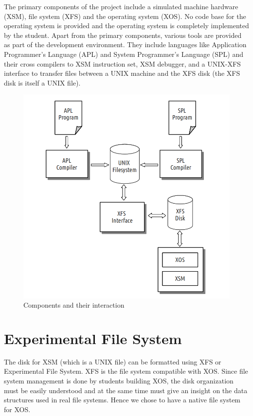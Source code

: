 \documentclass{sig-alternate}
\begin{document}
The primary components of the project include a simulated machine hardware (XSM), file system (XFS) and the operating system (XOS). No code base for the operating system is provided and the operating system is completely implemented by the student. Apart from the primary components, various tools are provided as part of the development environment. They include languages like Application Programmer's Language (APL) and System Programmer's Language (SPL) and their cross compilers to XSM instruction set, XSM debugger, and a UNIX-XFS interface to transfer files between a UNIX machine and the XFS disk (the XFS disk is itself a UNIX file). 

\begin{figure}[hbtp]
\centering
\includegraphics[scale=0.42]{components.png}
\caption{Components and their interaction}
\end{figure}



\section{Experimental File System }
The disk for XSM (which is a UNIX file) can be formatted using XFS or Experimental File System. XFS is the file system compatible with XOS. Since file system management is done by students building XOS, the disk organization must be easily understood and at the same time must give an insight on the data structures used in real file systems. Hence we chose to have a native file system for XOS.\\
\end{document}
